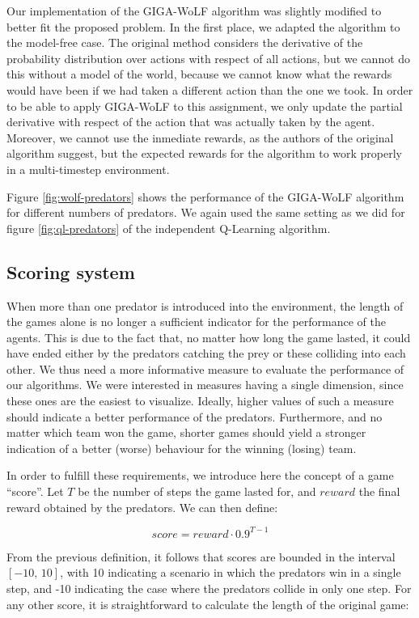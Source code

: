\documentclass[a4paper,12pt]{article}
\begin{document}
Our implementation of the GIGA-WoLF algorithm was slightly modified to better fit the proposed problem. In the first place, we adapted the algorithm to the model-free case. The original method considers the derivative of the probability distribution over actions with respect of all actions, but we cannot do this without a model of the world, because we cannot know what the rewards would have been if we had taken a different action than the one we took. In order to be able to apply GIGA-WoLF to this assignment, we only update the partial derivative with respect of the action that was actually taken by the agent. Moreover, we cannot use the inmediate rewards, as the authors of the original algorithm suggest, but the expected rewards for the algorithm to work properly in a multi-timestep environment.

Figure \ref{fig:wolf-predators} shows the performance of the GIGA-WoLF algorithm for different numbers of predators. We again used the same setting as we did for figure \ref{fig:ql-predators} of the independent Q-Learning algorithm.

\subsection{Scoring system}

When more than one predator is introduced into the environment, the length of the games alone is no longer a sufficient indicator for the performance of the agents. This is due to the fact that, no matter how long the game lasted, it could have ended either by the predators catching the prey or these colliding into each other. We thus need a more informative measure to evaluate the performance of our algorithms. We were interested in measures having a single dimension, since these ones are the easiest to visualize. Ideally, higher values of such a measure should indicate a better performance of the predators. Furthermore, and no matter which team won the game, shorter games should yield a stronger indication of a better (worse) behaviour for the winning (losing) team.

In order to fulfill these requirements, we introduce here the concept of a game ``score''. Let $T$ be the number of steps the game lasted for, and $reward$ the final reward obtained by the predators. We can then define:

$$ score = reward \cdot 0.9^{T - 1} $$

From the previous definition, it follows that scores are bounded in the interval $[-10,\,10]$, with 10 indicating a scenario in which the predators win in a single step, and -10 indicating the case where the predators collide in only one step. For any other score, it is straightforward to calculate the length of the original game:
\end{document}
